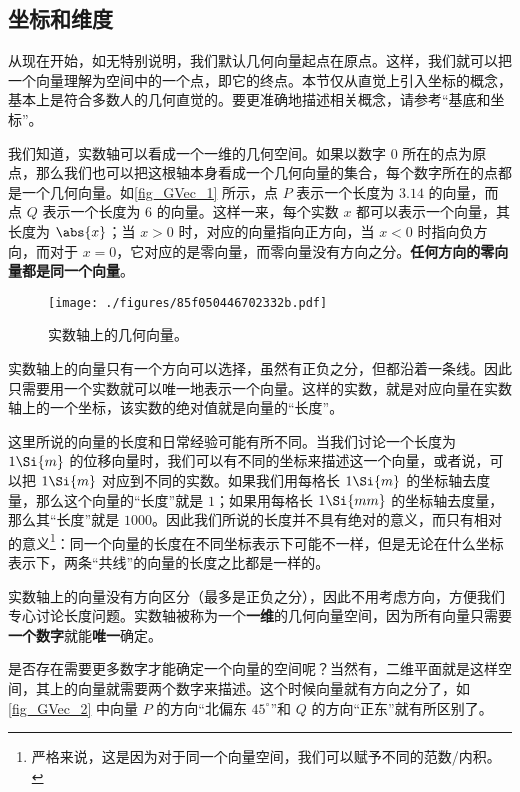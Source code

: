 \subsection{坐标和维度}
从现在开始，如无特别说明，我们默认几何向量起点在原点。这样，我们就可以把一个向量理解为空间中的一个点，即它的终点。本节仅从直觉上引入坐标的概念，基本上是符合多数人的几何直觉的。要更准确地描述相关概念，请参考“基底和坐标”。

我们知道，实数轴可以看成一个一维的几何空间。如果以数字 $0$ 所在的点为原点，那么我们也可以把这根轴本身看成一个几何向量的集合，每个数字所在的点都是一个几何向量。如\autoref{fig_GVec_1} 所示，点 $P$ 表示一个长度为 $3.14$ 的向量，而点 $Q$ 表示一个长度为 $6$ 的向量。这样一来，每个实数 $x$ 都可以表示一个向量，其长度为 $\abs{x}$；当 $x>0$ 时，对应的向量指向正方向，当 $x<0$ 时指向负方向，而对于 $x=0$，它对应的是零向量，而零向量没有方向之分。\textbf{任何方向的零向量都是同一个向量}。

\begin{figure}[ht]
\centering
\texttt{[image: ./figures/85f050446702332b.pdf]}
\caption{实数轴上的几何向量。} \label{fig_GVec_1}
\end{figure}

实数轴上的向量只有一个方向可以选择，虽然有正负之分，但都沿着一条线。因此只需要用一个实数就可以唯一地表示一个向量。这样的实数，就是对应向量在实数轴上的一个坐标，该实数的绝对值就是向量的“长度”。


这里所说的向量的长度和日常经验可能有所不同。当我们讨论一个长度为 $1\Si{m}$ 的位移向量时，我们可以有不同的坐标来描述这一个向量，或者说，可以把 $1\Si{m}$ 对应到不同的实数。如果我们用每格长 $1\Si{m}$ 的坐标轴去度量，那么这个向量的“长度”就是 $1$；如果用每格长 $1\Si{mm}$ 的坐标轴去度量，那么其“长度”就是 $1000$。因此我们所说的长度并不具有绝对的意义，而只有相对的意义\footnote{严格来说，这是因为对于同一个向量空间，我们可以赋予不同的范数/内积。}：同一个向量的长度在不同坐标表示下可能不一样，但是无论在什么坐标表示下，两条“共线”的向量的长度之比都是一样的。


实数轴上的向量没有方向区分（最多是正负之分），因此不用考虑方向，方便我们专心讨论长度问题。实数轴被称为一个\textbf{一维}的几何向量空间，因为所有向量只需要\textbf{一个数字}就能\textbf{唯一}确定。

是否存在需要更多数字才能确定一个向量的空间呢？当然有，二维平面就是这样空间，其上的向量就需要两个数字来描述。这个时候向量就有方向之分了，如\autoref{fig_GVec_2} 中向量 $P$ 的方向“北偏东 $45^\circ$”和 $Q$ 的方向“正东”就有所区别了。

